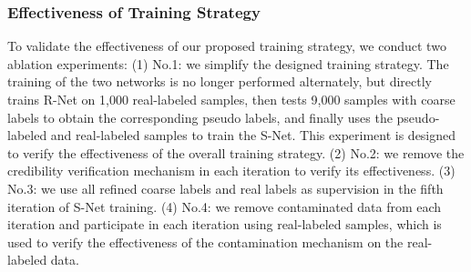 \documentclass[journal]{IEEEtran}
\begin{document}
\begin{table}[!t]
\centering
\renewcommand\arraystretch{1.4}
    \begin{spacing}{1}
    \caption{Ablation study of RGB Branch in R-Net on the PASCAL-S, DUTS-TE and HKU-IS datasets.}
    \label{rm-rgb_branch}
    \end{spacing}
\end{table}
\subsubsection{Effectiveness of Training Strategy}


To validate the effectiveness of our proposed training strategy, we conduct two ablation experiments:
(1) No.1: we simplify the designed training strategy. The training of the two networks is no longer performed alternately, but directly trains R-Net on 1,000 real-labeled samples, then tests 9,000 samples with coarse labels to obtain the corresponding pseudo labels, and finally uses the pseudo-labeled and real-labeled samples to train the S-Net. This experiment is designed to verify the effectiveness of the overall training strategy.
(2) No.2: we remove the credibility verification mechanism in each iteration to verify its effectiveness.
(3) No.3: we use all refined coarse labels and real labels as supervision in the fifth iteration of S-Net training.
(4) No.4: we remove contaminated data from each iteration and participate in each iteration using real-labeled samples, which is used to verify the effectiveness of the contamination mechanism on the real-labeled data.
\end{document}
